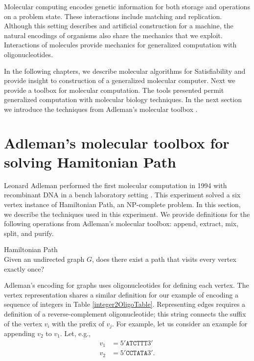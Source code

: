 Molecular computing encodes genetic information for both storage and operations on a problem state.  These interactions include matching and replication.  Although this setting describes and artificial construction for a machine, the natural encodings of organisms also share the mechanics that we exploit.  Interactions of molecules provide mechanics for generalized computation with oligonucleotides.
	
In the following chapters, we describe molecular algorithms for {\sc Satisfiability} and provide insight to construction of a generalized molecular computer.  Next we provide a toolbox for molecular computation.  The tools presented permit generalized computation with molecular biology techniques.  In the next section we introduce the techniques from Adleman's molecular toolbox \cite{Adleman:1994:MCS:189441.189442}.

\section{Adleman's molecular toolbox for solving {\sc Hamitonian Path}}
	
Leonard Adleman performed the first molecular computation in 1994 with recombinant DNA in a bench laboratory setting \cite{Adleman:1994:MCS:189441.189442}.  This experiment solved a six vertex instance of {\sc Hamiltonian Path}, an \textsf{NP-complete} problem.  In this section, we describe the techniques used in this experiment. We provide definitions for the following operations from Adleman's molecular toolbox: append, extract, mix, split, and purify.

\begin{definition}
{\sc Hamiltonian Path} \\
Given an undirected graph $G$, does there exist a path that visits every vertex exactly once?

\end{definition}

%


Adleman's encoding for graphs uses oligonucleotides for defining each vertex.  The vertex representation shares a similar definition for our example of encoding a sequence of integers in Table \ref{integer2OligoTable}.  Representing edges requires a definition of a reverse-complement oligonucleotide; this string connects the suffix of the vertex $v_i$ with the prefix of $v_j$.  For example, let us consider an example for appending $v_2$ to $v_1$.  Let, e.g.,
\begin{align*}
 v_1 &= 5'\texttt{ATCTTT}3' \\
 v_2 &= 5'\texttt{CCTATA}3'.
\end{align*}

